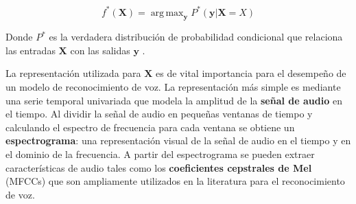 \documentclass[conference]{IEEEtran}
\DeclareMathOperator*{\argmax}{arg\,max}
\begin{document}
\begin{equation}
    f^\ast(\mathbf{X}) = \argmax_{\mathbf{y}} P^\ast(\mathbf{y}| \mathbf{X} = X)
\end{equation}

Donde $P^\ast$ es la verdadera distribución de probabilidad condicional que relaciona las entradas $\mathbf{X}$ con las salidas $\mathbf{y}$ \cite{Goodfellow-et-al-2016}.

La representación utilizada para $\mathbf{X}$ es de vital importancia para el desempeño de un modelo de reconocimiento de voz. La representación más simple es mediante una serie temporal univariada que modela la amplitud de la \textbf{señal de audio} en el tiempo. Al dividir la señal de audio en pequeñas ventanas de tiempo y calculando el espectro de frecuencia para cada ventana se obtiene un \textbf{espectrograma}: una representación visual de la señal de audio en el tiempo y en el dominio de la frecuencia. A partir del espectrograma se pueden extraer características de audio tales como los \textbf{coeficientes cepstrales de Mel} (MFCCs) que son ampliamente utilizados en la literatura para el reconocimiento de voz.
\end{document}
